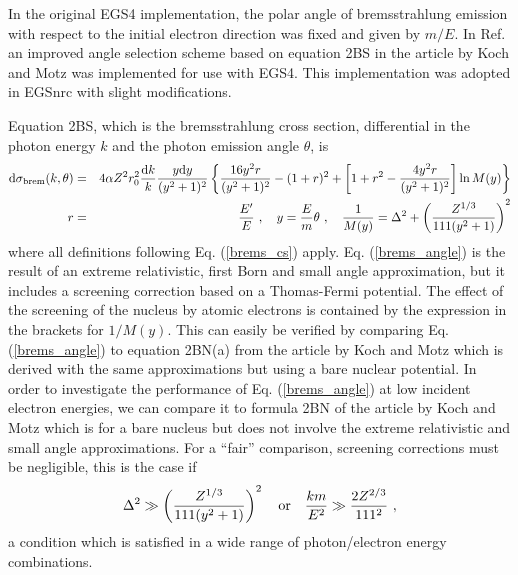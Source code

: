 In the original EGS4 implementation, the polar angle of bremsstrahlung
emission with respect to the initial electron direction was fixed
and given by $m/E$. In Ref. \cite{Bi89} an improved angle selection
scheme based on equation 2BS in the article by Koch and Motz \cite{KM59}
was implemented for use with EGS4. This implementation
was adopted in EGSnrc with slight modifications.

Equation 2BS, which is the bremsstrahlung cross section,
differential in the photon energy
$k$ and the photon emission angle $\theta$, is \cite{KM59}
\begin{eqnarray}
\label{brems_angle}
{\rm d}\sigma_{\rm brem}(k,\theta) & = & 4 \alpha Z^2 r_0^2 \frac{{\rm d}k}{k}
{y {\rm d} y \over (y^2 + 1)^2}
\left\{ {16 y^2 r \over (y^2 + 1)^2} - (1+r)^2 + \left[
1 + r^2 - {4 y^2 r \over (y^2 + 1)^2} \right] \ln M(y) \right\}
\nonumber \\
r & = & \frac{E'}{E}~, \quad y = \frac{E}{m} \theta~, \quad \frac{1}{M(y)} =
\Delta^2 + \left( {Z^{1/3} \over 111 (y^2 + 1)} \right)^2
\end{eqnarray}
where all definitions following Eq. (\ref{brems_cs}) apply.
Eq. (\ref{brems_angle}) is the result of an extreme relativistic,
first Born and small angle approximation, but it includes a
screening correction
based on a Thomas-Fermi potential. The effect of the screening
of the nucleus by atomic electrons is contained by the
expression in the brackets for $1/M(y)$. This can easily be
verified by comparing Eq. (\ref{brems_angle}) to equation
2BN(a) from the article by Koch and Motz which is derived
with the same approximations but using a bare nuclear potential.
In order to investigate the performance of
Eq. (\ref{brems_angle}) at low incident electron energies,
we can compare it to formula
2BN of the article by Koch and Motz which is for a bare
nucleus but does not involve the extreme relativistic
and small angle
approximations. For a ``fair'' comparison, screening corrections
must be negligible, this is the case if
\begin{equation}
\Delta^2 \gg \left( {Z^{1/3} \over 111 (y^2 + 1)} \right)^2 \quad
\mbox{or} \quad {k m \over E^2} \gg {2 Z^{2/3} \over 111^2}~,
\end{equation}
a condition which is satisfied in a wide range of photon/electron
energy combinations.
